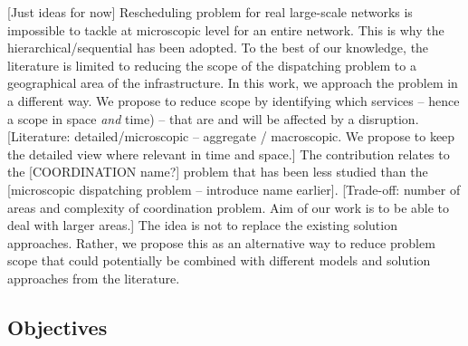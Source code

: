 \documentclass{article}
\begin{document}


[Just ideas for now]
Rescheduling problem for real large-scale networks is impossible to tackle at microscopic level for an entire network. This is why the hierarchical/sequential has been adopted. To the best of our knowledge, the literature is limited to reducing the scope of the dispatching problem to a geographical area of the infrastructure. In this work, we approach the problem in a different way. We propose to reduce scope by identifying which services -- hence a scope in space \emph{and} time) -- that are and will be affected by a disruption. [Literature: detailed/microscopic -- aggregate / macroscopic. We propose to keep the detailed view where relevant in time and space.] The contribution relates to the [COORDINATION name?] problem that has been less studied than the [microscopic dispatching problem -- introduce name earlier]. [Trade-off: number of areas and complexity of coordination problem. Aim of our work is to be able to deal with larger areas.] The idea is not to replace the existing solution approaches. Rather, we propose this as an alternative way to reduce problem scope that could potentially be combined with different models and solution approaches from the literature.


\subsection{Objectives} \label{sec:objectives}
\end{document}
